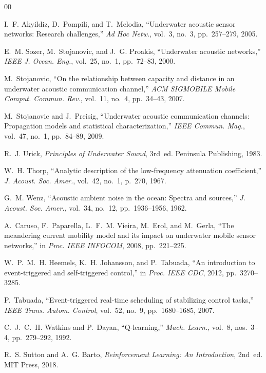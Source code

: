 \documentclass[journal]{IEEEtran}
\begin{document}
\begin{thebibliography}{00}

I.~F. Akyildiz, D.~Pompili, and T.~Melodia, ``Underwater acoustic sensor networks: Research challenges,'' \emph{Ad Hoc Netw.}, vol.~3, no.~3, pp.~257--279, 2005.

E.~M. Sozer, M.~Stojanovic, and J.~G. Proakis, ``Underwater acoustic networks,'' \emph{{IEEE} J. Ocean. Eng.}, vol.~25, no.~1, pp.~72--83, 2000.

M.~Stojanovic, ``On the relationship between capacity and distance in an underwater acoustic communication channel,'' \emph{{ACM} {SIGMOBILE} Mobile Comput. Commun. Rev.}, vol.~11, no.~4, pp.~34--43, 2007.

M.~Stojanovic and J.~Preisig, ``Underwater acoustic communication channels: Propagation models and statistical characterization,'' \emph{{IEEE} Commun. Mag.}, vol.~47, no.~1, pp.~84--89, 2009.

R.~J. Urick, \emph{Principles of Underwater Sound}, 3rd~ed. Peninsula Publishing, 1983.

W.~H. Thorp, ``Analytic description of the low-frequency attenuation coefficient,'' \emph{J. Acoust. Soc. Amer.}, vol.~42, no.~1, p.~270, 1967.

G.~M. Wenz, ``Acoustic ambient noise in the ocean: Spectra and sources,'' \emph{J. Acoust. Soc. Amer.}, vol.~34, no.~12, pp.~1936--1956, 1962.

A.~Caruso, F.~Paparella, L.~F.~M. Vieira, M.~Erol, and M.~Gerla, ``The meandering current mobility model and its impact on underwater mobile sensor networks,'' in \emph{Proc. {IEEE} INFOCOM}, 2008, pp.~221--225.

W.~P.~M.~H. Heemels, K.~H. Johansson, and P.~Tabuada, ``An introduction to event-triggered and self-triggered control,'' in \emph{Proc. {IEEE} CDC}, 2012, pp.~3270--3285.

P.~Tabuada, ``Event-triggered real-time scheduling of stabilizing control tasks,'' \emph{{IEEE} Trans. Autom. Control}, vol.~52, no.~9, pp.~1680--1685, 2007.

C.~J.~C.~H. Watkins and P.~Dayan, ``{Q}-learning,'' \emph{Mach. Learn.}, vol.~8, nos.~3--4, pp.~279--292, 1992.

R.~S. Sutton and A.~G. Barto, \emph{Reinforcement Learning: An Introduction}, 2nd~ed. MIT Press, 2018.


\end{thebibliography}
\end{document}

